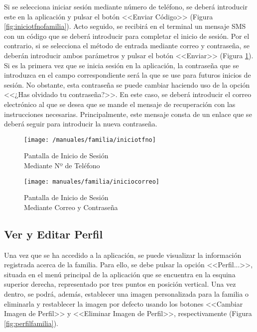 \clearpage

Si se selecciona iniciar sesión mediante número de teléfono, se deberá introducir este en la aplicación y pulsar el botón <<Enviar Código>> (Figura \ref{fig:iniciotfnofamilia}). Acto seguido, se recibirá en el terminal un mensaje \acs{SMS} con un código que se deberá introducir para completar el inicio de sesión. Por el contrario, si se selecciona el método de entrada mediante correo y contraseña, se deberán introducir ambos parámetros y pulsar el botón <<Enviar>> (Figura \ref{fig:iniciocorreofamilia}). Si es la primera vez que se inicia sesión en la aplicación, la contraseña que se introduzca en el campo correspondiente será la que se use para futuros inicios de sesión. No obstante, esta contraseña se puede cambiar haciendo uso de la opción <<¿Has olvidado tu contraseña?>>. En este caso, se deberá introducir el correo electrónico al que se desea que se mande el mensaje de recuperación con las instrucciones necesarias. Principalmente, este mensaje consta de un enlace que se deberá seguir para introducir la nueva contraseña.

\begin{figure}[!h]
	\centering
	\begin{minipage}{.5\textwidth}
		\centering
		\texttt{[image: /manuales/familia/iniciotfno]}
		\caption{Pantalla de Inicio de Sesión \\ Mediante Nº de Teléfono}
		\label{fig:iniciotfnofamilia}
	\end{minipage}%
	\begin{minipage}{.5\textwidth}
		\centering
		\texttt{[image: manuales/familia/iniciocorreo]}
		\caption{Pantalla de Inicio de Sesión \\ Mediante Correo y Contraseña}
		\label{fig:iniciocorreofamilia}
	\end{minipage}
\end{figure}

\clearpage

\subsection*{Ver y Editar Perfil}
Una vez que se ha accedido a la aplicación, se puede visualizar la información registrada acerca de la familia. Para ello, se debe pulsar la opción <<Perfil...>>, situada en el menú principal de la aplicación que se encuentra en la esquina superior derecha, representado por tres puntos en posición vertical. Una vez dentro, se podrá, además, establecer una imagen personalizada para la familia o eliminarla y restablecer la imagen por defecto usando los botones <<Cambiar Imagen de Perfil>> y <<Eliminar Imagen de Perfil>>, respectivamente (Figura \ref{fig:perfilfamilia}).

